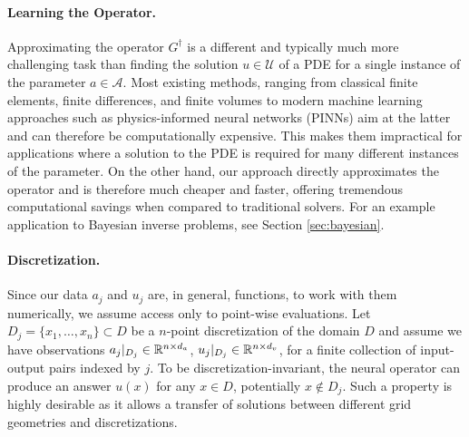 \documentclass{article} %
\newcommand{\kamyar}[1]{\textcolor{blue}{{\bf Kamyar:}  #1}}
\newcommand{\A}{\mathcal{A}}
\newcommand{\U}{\mathcal{U}}
\newcommand{\Ftrue}{G^\dagger}
\newcommand{\F}{{G}}
\begin{document}
\paragraph{Learning the Operator.} Approximating the operator \(\Ftrue\) is a different and typically much more challenging task than finding the solution \(u \in \U\) of a PDE for a single instance of the parameter \(a \in \A\). Most existing methods, ranging from classical finite elements, finite differences, and finite volumes to modern machine learning approaches such as physics-informed neural networks (PINNs) \citep{raissi2019physics} aim at the latter and can therefore be computationally expensive. This makes them impractical for applications where a solution to the PDE is required for many different instances of the parameter. On the other hand, our approach directly approximates the operator and is therefore much cheaper and faster, offering tremendous computational savings when compared to traditional solvers. For an example application to Bayesian inverse problems, see Section \ref{sec:bayesian}.





\paragraph{Discretization.} Since our data \(a_j\) and \(u_j\) are, in general, functions, to work with them numerically, we assume access only to point-wise evaluations. 
Let \(D_j = \{x_1,\dots,x_n\} \subset D\) be a \(n\)-point discretization of the domain \(D\) and assume we have observations \(a_j|_{D_j} \in \mathbb{R}^{n \times d_a}\), \(u_j|_{D_j} \in \mathbb{R}^{n\times d_v}\), for a finite collection  of input-output pairs indexed by $j$.
To be discretization-invariant, the neural operator can produce an answer \(u(x)\) for any \(x \in D\), potentially $x \notin D_j$.
Such a property is highly desirable as it allows a transfer of solutions between different grid geometries and discretizations.
\end{document}
